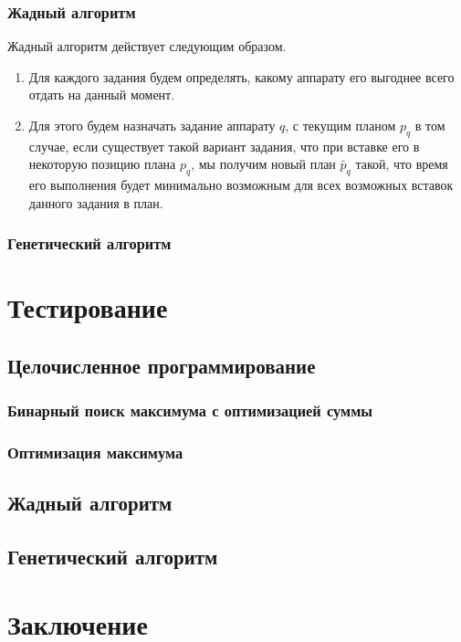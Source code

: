 \documentclass[a4paper,14pt,russian]{article}
\begin{document}

\subsubsection{Жадный алгоритм}
Жадный алгоритм действует следующим образом.



\begin{enumerate}
\item Для каждого задания будем определять, какому аппарату его выгоднее всего отдать на данный момент.
\item Для этого будем назначать задание аппарату $q$, с текущим планом $p_q$ в том случае, если существует такой вариант задания, что при вставке его в некоторую позицию плана $p_q$, мы получим новый план $\widetilde{p_q}$ такой, что время его выполнения будет минимально возможным для всех возможных вставок данного задания в план.
\end{enumerate}
\subsubsection{Генетический алгоритм}


\section{Тестирование}
\subsection{Целочисленное программирование}
\subsubsection{Бинарный поиск максимума с оптимизацией суммы}
\subsubsection{Оптимизация максимума}
\subsection{Жадный алгоритм}
\subsection{Генетический алгоритм}

\section{Заключение}

\pagebreak



\end{document}

